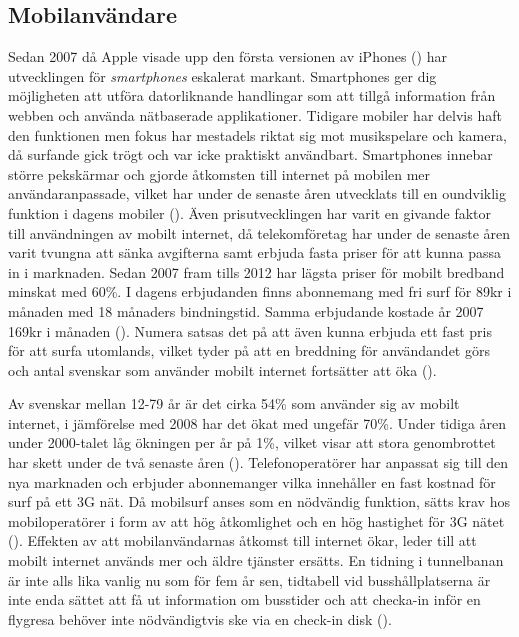 \documentclass[11pt]{article}
\begin{document}
\subsection{Mobilanvändare}

Sedan 2007 då Apple visade upp den första versionen av iPhones (\cite{AppleRevolution}) har utvecklingen för \textit{smartphones} eskalerat markant. Smartphones ger dig möjligheten att utföra datorliknande handlingar som att tillgå information från webben och använda nätbaserade applikationer. Tidigare mobiler har delvis haft den funktionen men fokus har mestadels riktat sig mot musikspelare och kamera, då surfande gick trögt och var icke praktiskt användbart.
Smartphones innebar större pekskärmar och gjorde åtkomsten till internet på mobilen mer användaranpassade, vilket har under de senaste åren utvecklats till en oundviklig funktion i dagens mobiler (\cite[s. 4]{Cfigroup_2009}).  Även prisutvecklingen har varit en givande faktor till användningen av mobilt internet, då telekomföretag har under de senaste åren varit tvungna att sänka avgifterna samt erbjuda fasta priser för att kunna passa in i marknaden. Sedan 2007 fram tills 2012 har lägsta priser för mobilt bredband minskat med 60\%. I dagens erbjudanden finns abonnemang med fri surf för 89kr i månaden med 18 månaders bindningstid. Samma erbjudande kostade år 2007 169kr i månaden (\cite[s. 36]{pts}). Numera satsas det på att även kunna erbjuda ett fast pris för att surfa utomlands, vilket tyder på att en breddning för användandet görs och antal svenskar som använder mobilt internet fortsätter att öka (\cite{telekomidag}).

Av svenskar mellan 12-79 år är det cirka 54\% som använder sig av mobilt internet, i jämförelse med 2008 har det ökat med ungefär 70\%. Under tidiga åren under 2000-talet låg ökningen per år på 1\%, vilket visar att stora genombrottet har skett under de två senaste åren (\cite[s. 24]{.se}).  Telefonoperatörer har anpassat sig till den nya marknaden och erbjuder abonnemanger vilka innehåller en fast kostnad för surf på ett 3G nät. Då mobilsurf anses som en nödvändig funktion, sätts krav hos mobiloperatörer i form av att hög åtkomlighet och en hög hastighet för 3G nätet (\cite[s. 17]{Cfigroup_2009}). Effekten av att mobilanvändarnas åtkomst till internet ökar, leder till att mobilt internet används mer och äldre tjänster ersätts. En tidning i tunnelbanan är inte alls lika vanlig nu som för fem år sen, tidtabell vid busshållplatserna är inte enda sättet att få ut information om busstider och att checka-in inför en flygresa behöver inte nödvändigtvis ske via en check-in disk (\cite{kpcb}).
\end{document}
